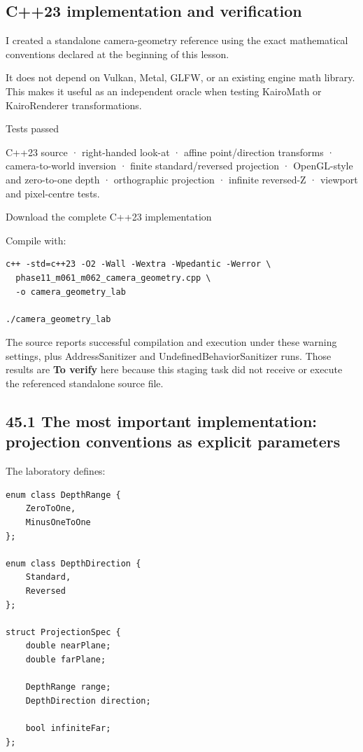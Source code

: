 \subsection{C++23 implementation and verification}\label{02-foundations-ii-ch037-c23-implementation-and-verification}

I created a standalone camera-geometry reference using the exact mathematical conventions declared at the beginning of this lesson.

It does not depend on Vulkan, Metal, GLFW, or an existing engine math library. This makes it useful as an independent oracle when testing KairoMath or KairoRenderer transformations.

Tests passed

C++23 source · right-handed look-at · affine point/direction transforms · camera-to-world inversion · finite standard/reversed projection · OpenGL-style and zero-to-one depth · orthographic projection · infinite reversed-Z · viewport and pixel-centre tests.

Download the complete C++23 implementation

Compile with:

\begin{verbatim}
c++ -std=c++23 -O2 -Wall -Wextra -Wpedantic -Werror \
  phase11_m061_m062_camera_geometry.cpp \
  -o camera_geometry_lab

./camera_geometry_lab
\end{verbatim}

The source reports successful compilation and execution under these warning settings, plus AddressSanitizer and UndefinedBehaviorSanitizer runs. Those results are \textbf{To verify} here because this staging task did not receive or execute the referenced standalone source file.

\subsection{45.1 The most important implementation: projection conventions as explicit parameters}\label{02-foundations-ii-ch037-the-most-important-implementation-projection-conventions-as-explicit-parameters}

The laboratory defines:

\begin{verbatim}
enum class DepthRange {
    ZeroToOne,
    MinusOneToOne
};

enum class DepthDirection {
    Standard,
    Reversed
};

struct ProjectionSpec {
    double nearPlane;
    double farPlane;

    DepthRange range;
    DepthDirection direction;

    bool infiniteFar;
};
\end{verbatim}


